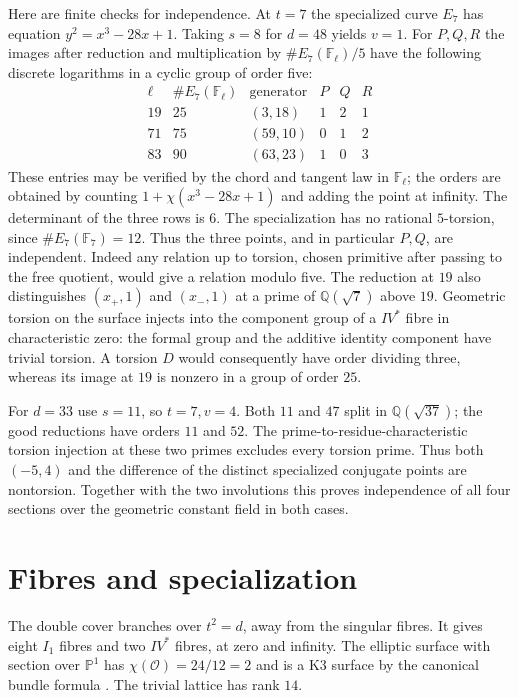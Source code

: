 \documentclass[11pt]{article}
\newcommand{\Q}{\mathbb Q}
\newcommand{\F}{\mathbb F}
\begin{document}
Here are finite checks for independence. At $t=7$ the specialized
curve $E_7$ has equation $y^2=x^3-28x+1$. Taking $s=8$ for
$d=48$ yields $v=1$. For $P,Q,R$ the images after reduction and
multiplication by $\#E_7(\F_\ell)/5$ have the following discrete
logarithms in a cyclic group of order five:
\[
\begin{array}{c|r|c|ccc}
\ell & \#E_7(\F_\ell)&\text{generator}&P&Q&R\\\hline
19&25&(3,18)&1&2&1\\
71&75&(59,10)&0&1&2\\
83&90&(63,23)&1&0&3
\end{array}
\]
These entries may be verified by the chord and tangent law in
$\F_\ell$; the orders are obtained by counting $1+\chi(x^3-28x+1)$
and adding the point at infinity. The determinant of the three rows
is $6$. The specialization has no rational $5$-torsion, since
$\#E_7(\F_7)=12$. Thus the three points, and in particular $P,Q$,
are independent. Indeed any relation up to torsion, chosen primitive
after passing to the free quotient, would give a relation modulo five.
The reduction at $19$ also distinguishes $(x_+,1)$ and $(x_-,1)$
at a prime of $\Q(\sqrt7)$ above $19$. Geometric torsion on the
surface injects into the component group of a $IV^*$ fibre in
characteristic zero: the formal group and the additive identity
component have trivial torsion. A torsion $D$ would consequently have
order dividing three, whereas its image at $19$ is nonzero in a
group of order $25$.

For $d=33$ use $s=11$, so $t=7,v=4$. Both $11$ and $47$ split in
$\Q(\sqrt{37})$; the good reductions have orders $11$ and $52$.
The prime-to-residue-characteristic torsion injection at these two
primes excludes every torsion prime. Thus both $(-5,4)$ and the
difference of the distinct specialized conjugate points are nontorsion.
Together with the two involutions this proves independence of all four
sections over the geometric constant field in both cases.

\section{Fibres and specialization}
The double cover branches over $t^2=d$, away from the singular fibres.
It gives eight $I_1$ fibres and two $IV^*$ fibres, at zero and infinity.
The elliptic surface with section over $\mathbb P^1$ has
$\chi(\mathcal O)=24/12=2$ and is a K3 surface by the canonical
bundle formula \cite{SS}. The trivial lattice has rank $14$.
\end{document}
